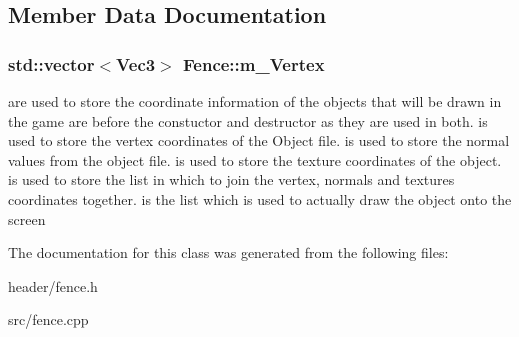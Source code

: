 \subsection{Member Data Documentation}
\hypertarget{classFence_a4b5ae58d96d77af0de4dfc874a8e4b67}{
\subsubsection[{m\_\-Vertex}]{\setlength{\rightskip}{0pt plus 5cm}std::vector$<${\bf Vec3}$>$ {\bf Fence::m\_\-Vertex}}}
\label{classFence_a4b5ae58d96d77af0de4dfc874a8e4b67}
are used to store the coordinate information of the objects that will be drawn in the game  are before the constuctor and destructor as they are used in both.  is used to store the vertex coordinates of the Object file.  is used to store the normal values from the object file.  is used to store the texture coordinates of the object.  is used to store the list in which to join the vertex, normals and textures coordinates together.  is the list which is used to actually draw the object onto the screen 

The documentation for this class was generated from the following files:\begin{DoxyCompactItemize}
\item 
header/fence.h\item 
src/fence.cpp\end{DoxyCompactItemize}
